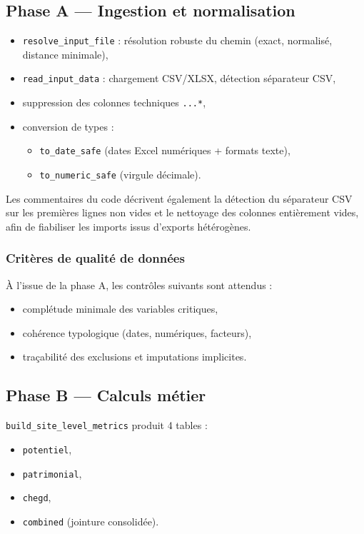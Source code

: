 \documentclass[11pt,a4paper]{article}
\begin{document}
\subsection{Phase A --- Ingestion et normalisation}
\begin{itemize}[leftmargin=1.2cm]
  \item \texttt{resolve\_input\_file} : résolution robuste du chemin (exact, normalisé, distance minimale),
  \item \texttt{read\_input\_data} : chargement CSV/XLSX, détection séparateur CSV,
  \item suppression des colonnes techniques \texttt{...*},
  \item conversion de types :
  \begin{itemize}
    \item \texttt{to\_date\_safe} (dates Excel numériques + formats texte),
    \item \texttt{to\_numeric\_safe} (virgule décimale).
  \end{itemize}
\end{itemize}

Les commentaires du code décrivent également la détection du séparateur CSV
sur les premières lignes non vides et le nettoyage des colonnes entièrement
vides, afin de fiabiliser les imports issus d'exports hétérogènes.

\subsubsection{Critères de qualité de données}
À l'issue de la phase A, les contrôles suivants sont attendus :
\begin{itemize}[leftmargin=1.2cm]
  \item complétude minimale des variables critiques,
  \item cohérence typologique (dates, numériques, facteurs),
  \item traçabilité des exclusions et imputations implicites.
\end{itemize}

\subsection{Phase B --- Calculs métier}
\texttt{build\_site\_level\_metrics} produit 4 tables :
\begin{itemize}[leftmargin=1.2cm]
  \item \texttt{potentiel},
  \item \texttt{patrimonial},
  \item \texttt{chegd},
  \item \texttt{combined} (jointure consolidée).
\end{itemize}
\end{document}
